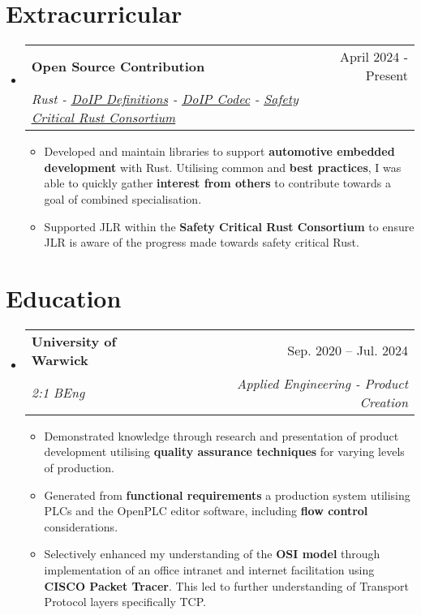 \documentclass[letterpaper,11pt]{article}
\makeatletter
\newcommand{\resumeItem}[1]{
  \item\small{
    {#1 \vspace{-2pt}}
  }
}
\newcommand{\resumeSubheading}[4]{
  \vspace{-2pt}\item
    \begin{tabular*}{0.97\textwidth}[t]{l@{\extracolsep{\fill}}r}
      \textbf{#1} & #2 \\
      \textit{\small#3} & \textit{\small #4} \\
    \end{tabular*}\vspace{-7pt}
}
\newcommand{\resumeSubHeadingListStart}{\begin{itemize}[leftmargin=0.15in, label={}]}
\newcommand{\resumeSubHeadingListEnd}{\end{itemize}}
\newcommand{\resumeItemListStart}{\begin{itemize}}
\newcommand{\resumeItemListEnd}{\end{itemize}\vspace{-5pt}}
\makeatother
\begin{document}
\section{Extracurricular}
  \resumeSubHeadingListStart
    \resumeSubheading
      {Open Source Contribution}{April 2024 - Present}
      {Rust - \href{https://crates.io/crates/doip-definitions}{\underline{DoIP Definitions}} - \href{https://crates.io/crates/doip-codec}{\underline{DoIP Codec}} - \href{https://github.com/rustfoundation/safety-critical-rust-consortium}{\underline{Safety Critical Rust Consortium}}}{}
      \resumeItemListStart
      \resumeItem{Developed and maintain libraries to support \textbf{automotive embedded development} with Rust. Utilising common and \textbf{best practices}, I was able to quickly gather \textbf{interest from others} to contribute towards a goal of combined specialisation.}
      \resumeItem{Supported JLR within the \textbf{Safety Critical Rust Consortium} to ensure JLR is aware of the progress made towards safety critical Rust.}
      \resumeItemListEnd
  \resumeSubHeadingListEnd
\section{Education}
  \resumeSubHeadingListStart
    \resumeSubheading
      {University of Warwick}{Sep. 2020 -- Jul. 2024}
      {2:1 BEng}{Applied Engineering - Product Creation}
      \resumeItemListStart
      \resumeItem{Demonstrated knowledge through research and presentation of product development utilising \textbf{quality assurance techniques} for varying levels of production.}
      \resumeItem{Generated from \textbf{functional requirements} a production system utilising PLCs and the OpenPLC editor software, including \textbf{flow control} considerations.}
      \resumeItem{Selectively enhanced my understanding of the \textbf{OSI model} through implementation of an office intranet and internet facilitation using \textbf{CISCO Packet Tracer}. This led to further understanding of Transport Protocol layers specifically TCP.}
      \resumeItemListEnd
  \resumeSubHeadingListEnd
\end{document}
